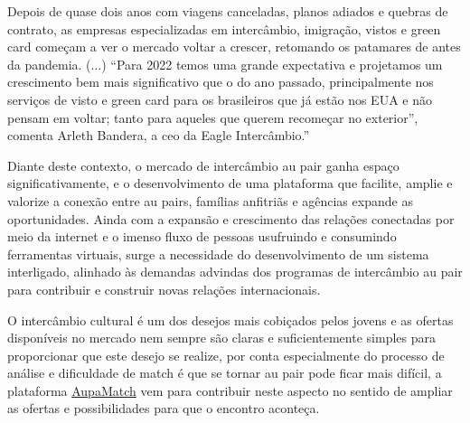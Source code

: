     \begin{citacao}
       Depois de quase dois anos com viagens canceladas, planos adiados e quebras de contrato, as empresas especializadas em intercâmbio, imigração, vistos e green card começam a ver o mercado voltar a crescer, retomando os patamares de antes da pandemia. (...) “Para 2022 temos uma grande expectativa e projetamos um crescimento bem mais significativo que o do ano passado, principalmente nos serviços de visto e green card para os brasileiros que já estão nos EUA e não pensam em voltar; tanto para aqueles que querem recomeçar no exterior”, comenta Arleth Bandera, a \ac{ceo} da Eagle Intercâmbio.”
       \cite{valorIveste2022}
    \end{citacao}
    
    Diante deste contexto, o mercado de intercâmbio au pair ganha espaço significativamente, e o desenvolvimento de uma plataforma que facilite, amplie e valorize a conexão entre au pairs, famílias anfitriãs e agências expande as oportunidades.
    Ainda com a expansão e crescimento das relações conectadas por meio da internet e o imenso fluxo de pessoas usufruindo e consumindo ferramentas virtuais, surge a necessidade do desenvolvimento de um sistema interligado, alinhado às demandas advindas dos programas de intercâmbio au pair para contribuir e construir novas relações internacionais.
    
    O intercâmbio cultural é um dos desejos mais cobiçados pelos jovens e as ofertas disponíveis no mercado nem sempre são claras e suficientemente simples para proporcionar que este desejo se realize, por conta especialmente do processo de análise e dificuldade de \gls{match} é que se tornar au pair pode ficar mais difícil, a plataforma
    \href{https://aupamatch.pages.dev/home}{AupaMatch} vem para contribuir neste aspecto no sentido de ampliar as ofertas e possibilidades para que o encontro aconteça.

